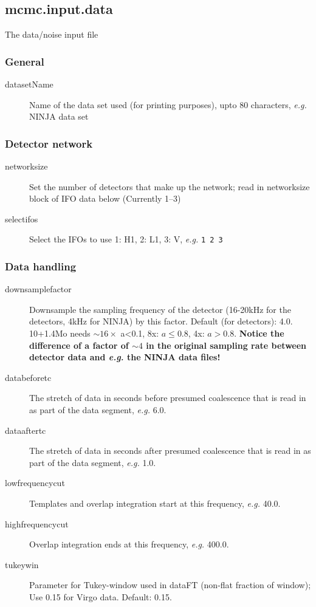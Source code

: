 \documentclass[10pt]{article}
\begin{document}
\pagebreak
\subsection{mcmc.input.data}
The data/noise input file


\subsubsection{General}
\begin{description}
\item[datasetName] Name of the data set used (for printing purposes), upto 80 characters, \textit{e.g.} NINJA data set
\end{description}

\subsubsection{Detector network}
\begin{description}
\item[networksize] Set the number of detectors that make up the network; read in networksize block of IFO data below (Currently 1--3)
\item[selectifos] Select the IFOs to use  1: H1, 2: L1, 3: V, \textit{e.g.} \texttt{1 2 3} 
\end{description}

\subsubsection{Data handling}
\begin{description}
\item[downsamplefactor] Downsample the sampling frequency of the detector (16-20kHz for the detectors, 4kHz for NINJA) by this factor.  Default (for detectors): 4.0. 10+1.4Mo needs $\sim 16\times$ a<0.1, 8x: $a\leq 0.8$, 4x: $a>0.8$. \textbf{Notice the difference of a factor of $\sim4$ in the original sampling rate between detector data and \textit{e.g.} the NINJA data files!}
\item[databeforetc] The stretch of data in seconds before presumed coalescence that is read in as part of the data segment, \textit{e.g.} 6.0.
\item[dataaftertc] The stretch of data in seconds after presumed coalescence that is read in as part of the data segment, \textit{e.g.} 1.0.
\item[lowfrequencycut] Templates and overlap integration start at this frequency, \textit{e.g.} 40.0.
\item[highfrequencycut] Overlap integration ends at this frequency, \textit{e.g.} 400.0.
\item[tukeywin] Parameter for Tukey-window used in dataFT (non-flat fraction of window);  Use 0.15 for Virgo data.  Default: 0.15.
\end{description}
\end{document}
